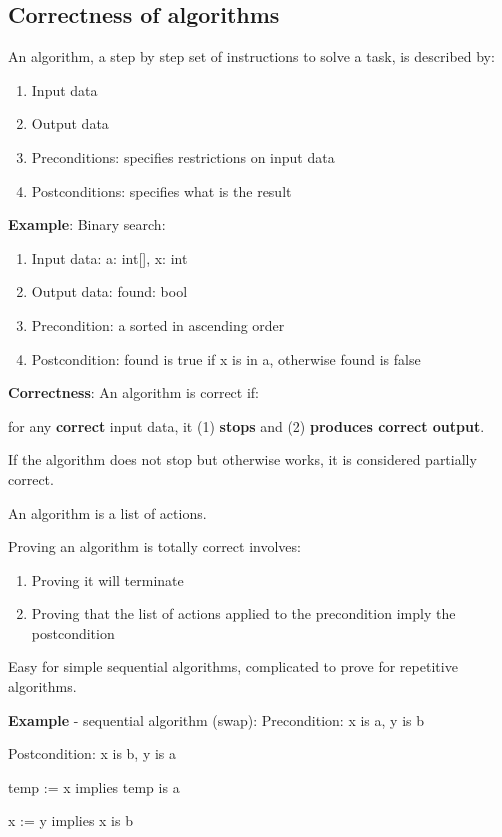 \documentclass{article}
\begin{document}
\subsection{Correctness of algorithms}
An algorithm, a step by step set of instructions to solve a task, is described by:
\begin{enumerate}
    \item Input data
    \item Output data
    \item Preconditions: specifies restrictions on input data
    \item Postconditions: specifies what is the result
\end{enumerate}

\textbf{Example}: Binary search:
\begin{enumerate}
    \item Input data: a: int[], x: int
    \item Output data: found: bool
    \item Precondition: a sorted in ascending order
    \item Postcondition: found is true if x is in a, otherwise found is false
\end{enumerate}

\textbf{Correctness}: An algorithm is correct if:

for any \textbf{correct} input data, it (1) \textbf{stops} and (2) \textbf{produces correct output}.

If the algorithm does not stop but otherwise works, it is considered partially correct.

An algorithm is a list of actions.

Proving an algorithm is totally correct involves:
\begin{enumerate}
    \item Proving it will terminate
    \item Proving that the list of actions applied to the precondition imply the postcondition
\end{enumerate}

Easy for simple sequential algorithms, complicated to prove for repetitive algorithms.

\textbf{Example} - sequential algorithm (swap):
Precondition: x is a, y is b

Postcondition: x is b, y is a

temp := x implies temp is a

x := y implies x is b
\end{document}
